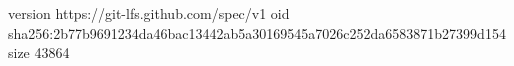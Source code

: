 version https://git-lfs.github.com/spec/v1
oid sha256:2b77b9691234da46bac13442ab5a30169545a7026c252da6583871b27399d154
size 43864
